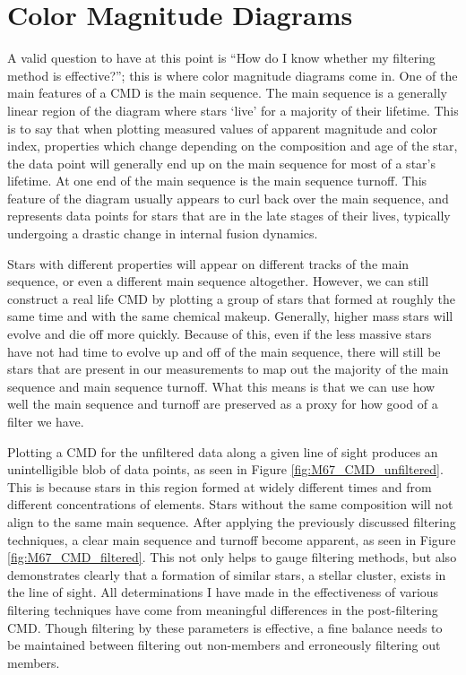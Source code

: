\documentclass[aps,prb,twocolumn,groupedaddress,nofootinbib,floatfix]{revtex4-1}
\begin{document}
\section*{Color Magnitude Diagrams}
A valid question to have at this point is ``How do I know whether my filtering method is effective?''; this is where color magnitude diagrams come in. One of the main features of a CMD is the main sequence. The main sequence is a generally linear region of the diagram where stars `live' for a majority of their lifetime. This is to say that when plotting measured values of apparent magnitude and color index, properties which change depending on the composition and age of the star, the data point will generally end up on the main sequence for most of a star's lifetime. At one end of the main sequence is the main sequence turnoff. This feature of the diagram usually appears to curl back over the main sequence, and represents data points for stars that are in the late stages of their lives, typically undergoing a drastic change in internal fusion dynamics. 

Stars with different properties will appear on different tracks of the main sequence, or even a different main sequence altogether. However, we can still construct a real life CMD by plotting a group of stars that formed at roughly the same time and with the same chemical makeup. Generally, higher mass stars will evolve and die off more quickly. Because of this, even if the less massive stars have not had time to evolve up and off of the main sequence, there will still be stars that are present in our measurements to map out the majority of the main sequence and main sequence turnoff. What this means is that we can use how well the main sequence and turnoff are preserved as a proxy for how good of a filter we have.

Plotting a CMD for the unfiltered data along a given line of sight produces an unintelligible blob of data points, as seen in Figure \ref{fig:M67_CMD_unfiltered}. This is because stars in this region formed at widely different times and from different concentrations of elements. Stars without the same composition will not align to the same main sequence. After applying the previously discussed filtering techniques, a clear main sequence and turnoff become apparent, as seen in Figure \ref{fig:M67_CMD_filtered}. This not only helps to gauge filtering methods, but also demonstrates clearly that a formation of similar stars, a stellar cluster, exists in the line of sight. All determinations I have made in the effectiveness of various filtering techniques have come from meaningful differences in the post-filtering CMD. Though filtering by these parameters is effective, a fine balance needs to be maintained between filtering out non-members and erroneously filtering out members.
\end{document}
